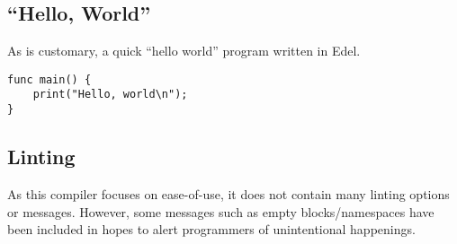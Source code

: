 \subsection{``Hello, World''}\label{subsec:hello-world}

As is customary, a quick ``hello world'' program written in Edel.

\begin{lstlisting}[language=CustomLang]
func main() {
    print("Hello, world\n");
}
\end{lstlisting}

\subsection{Linting}

As this compiler focuses on ease-of-use, it does not contain many linting options or messages.
However, some messages such as empty blocks/namespaces have been included in hopes to alert programmers of unintentional happenings.